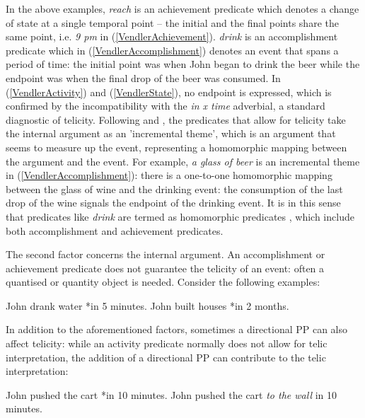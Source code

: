 \documentclass[output=paper]{langsci/langscibook}
\begin{document}
In the above examples, \emph{reach} is an achievement predicate which denotes a
change of state at a single temporal point -- the initial and the final points
share the same point, i.e. \emph{9 pm} in (\ref{VendlerAchievement}).
\emph{drink} is an accomplishment predicate which in
(\ref{VendlerAccomplishment}) denotes an event that spans a period of time: the
initial point was when John began to drink the beer while the endpoint was when
the final drop of the beer was consumed. In (\ref{VendlerActivity}) and
(\ref{VendlerState}), no endpoint is expressed, which is confirmed by the
incompatibility with the \emph{in x time} adverbial, a standard diagnostic of
telicity. Following \textcite{dowty1991thematic} and
\textcite{Rothstein2004}, the predicates that allow for telicity take
the internal argument as an 'incremental theme', which is an argument that
seems to measure up the event, representing a homomorphic mapping between the
argument and the event. For example, \emph{a glass of beer} is an incremental
theme in (\ref{VendlerAccomplishment}): there is a one-to-one homomorphic
mapping between the glass of wine and the drinking event: the consumption of
the last drop of the wine signals the endpoint of the drinking event. It is in
this sense that predicates like \emph{drink} are termed as homomorphic
predicates \citep{krifka1992,krifka1998originstelicity,filip1997}, which
include both accomplishment and achievement predicates.

The second factor concerns the internal argument. An accomplishment or
achievement predicate does not guarantee the telicity of an event: often a
quantised or quantity object
\citep{krifka1992,krifka1998originstelicity,Borer2005a,Borer2005b}
is needed. Consider the following examples:

\begin{exe}
\ex\begin{xlist}
	\ex John drank water *in 5 minutes.
    \ex John built houses *in 2 months.
\end{xlist}
\end{exe}

In addition to the aforementioned factors, sometimes a directional PP can also
affect telicity: while an activity predicate normally does not allow for telic
interpretation, the addition of a directional PP can contribute to the telic
interpretation:

\begin{exe}
\ex\begin{xlist}
	\ex John pushed the cart *in 10 minutes.
    \ex John pushed the cart \emph{to the wall} in 10 minutes.
\end{xlist}
\end{exe}
\end{document}
